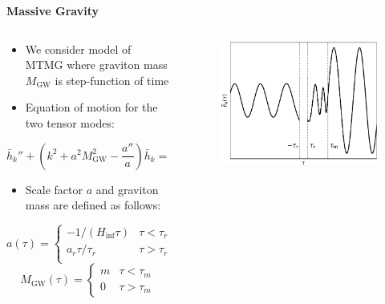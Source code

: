 \documentclass{beamer}                             %
\newcommand{\blocktitle}[1]{{\Large \textbf{#1}}}
\begin{document}
\begin{frame}[t]
\begin{columns}[T]
\begin{column}{0.30\textwidth}
  \begin{tcolorbox}
    \blocktitle{Massive Gravity}
    \vspace{0.25\baselineskip}
    \begin{columns}
      \hfill
      \begin{column}{0.5\textwidth}
      \begin{itemize}
          \item  We consider model of MTMG \cite{DeFelice:2015hla} where graviton mass $M_{\text{GW}}$ is step-function of time \cite{Fujita:2018ehq}
          \item Equation of motion for the two tensor modes:
      \end{itemize} 
      $$\bar{h}_k'' + \left(k^2 + a^2 M_\text{GW}^2 - \frac{a''}{a}\right)\bar{h}_k = 0 $$  
    \begin{itemize}
        \item Scale factor $a$ and graviton mass are defined as follows:
    \end{itemize}
        $$a(\tau) = 
    \begin{cases}
        -1/(H_{\inf}\tau) & \tau < \tau_r \\
        a_r \tau/\tau_r & \tau > \tau_r \\
   \end{cases} $$
    $$M_\text{GW}(\tau) = 
    \begin{cases}
        m & \tau < \tau_m \\
        0 & \tau > \tau_m
   \end{cases}$$
      \end{column}
      \begin{column}{0.48\textwidth}
        \begin{figure}[t]
          \centering
          \includegraphics[width=\linewidth]{fig0-cropped.pdf} 
          \label{fig:mode}
        \end{figure}
      \end{column}
    \end{columns}
  \end{tcolorbox}
\end{column}


\end{columns}
\end{frame}
\end{document}
